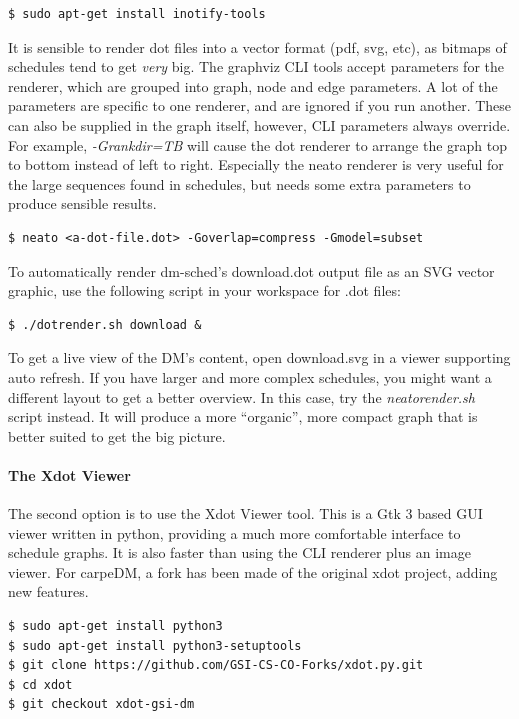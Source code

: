 \begin{lstlisting}[style = customshell]
$ sudo apt-get install inotify-tools
\end{lstlisting}

It is sensible to render dot files into a vector format (pdf, svg, etc), as bitmaps of schedules tend to get \emph{very} big. The graphviz CLI tools accept parameters for the renderer, which are grouped
into graph, node and edge parameters. A lot of the parameters are specific to one renderer, and are ignored if you run another. These can also be supplied in the graph itself, however, CLI parameters always override. For example, \emph{-Grankdir=TB} will cause the dot renderer to arrange the graph top to bottom instead of left to right. Especially the neato renderer is very useful for the large sequences found in schedules, but needs some extra parameters to produce sensible results.

\begin{lstlisting}[style = customshell]
$ neato <a-dot-file.dot> -Goverlap=compress -Gmodel=subset
\end{lstlisting}

To automatically render dm-sched's download.dot output file as an SVG vector graphic, use the following script in your workspace for .dot files:
%
\begin{lstlisting}[style = customshell]
$ ./dotrender.sh download &
\end{lstlisting}
%
To get a live view of the DM's content, open download.svg in a viewer supporting auto refresh. If you have larger and more complex schedules, you might want a different layout to get a better overview. In this case, try the \mbox{\emph{neatorender.sh}} script instead. It will produce a more \enquote{organic}, more compact graph that is better suited to get the big picture.

\paragraph{The Xdot Viewer}

The second option is to use the Xdot Viewer tool. This is a Gtk 3 based GUI viewer written in python, providing a much more comfortable interface to schedule graphs. It is also faster than using the CLI renderer plus an image viewer. For carpeDM, a fork has been made of the original xdot project, adding new features.

\begin{lstlisting}[style = customshell]
$ sudo apt-get install python3
$ sudo apt-get install python3-setuptools
$ git clone https://github.com/GSI-CS-CO-Forks/xdot.py.git
$ cd xdot
$ git checkout xdot-gsi-dm
\end{lstlisting}

